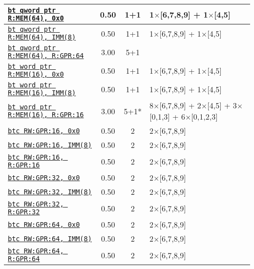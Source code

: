 \documentclass[a4paper,english,fontsize=9]{scrartcl}
\begin{document}
\begin{longtable}{p{}ccL{.25\textwidth}}
  \midrule
  \texttt{\href{https://felixcloutier.com/x86/BT.html}{bt qword ptr R:MEM(64), 0x0}} & 0.50 & 1+1 & 1\(\times\)[6,7,8,9] + 1\(\times\)[4,5] \\
  \midrule
  \texttt{\href{https://felixcloutier.com/x86/BT.html}{bt qword ptr R:MEM(64), IMM(8)}} & 0.50 & 1+1 & 1\(\times\)[6,7,8,9] + 1\(\times\)[4,5] \\
  \midrule
  \texttt{\href{https://felixcloutier.com/x86/BT.html}{bt qword ptr R:MEM(64), R:GPR:64}} & 3.00 & 5+1 &  \\
  \midrule
  \texttt{\href{https://felixcloutier.com/x86/BT.html}{bt word ptr R:MEM(16), 0x0}} & 0.50 & 1+1 & 1\(\times\)[6,7,8,9] + 1\(\times\)[4,5] \\
  \midrule
  \texttt{\href{https://felixcloutier.com/x86/BT.html}{bt word ptr R:MEM(16), IMM(8)}} & 0.50 & 1+1 & 1\(\times\)[6,7,8,9] + 1\(\times\)[4,5] \\
  \midrule
  \texttt{\href{https://felixcloutier.com/x86/BT.html}{bt word ptr R:MEM(16), R:GPR:16}} & 3.00 & 5+1* & 8\(\times\)[6,7,8,9] + 2\(\times\)[4,5] + 3\(\times\)[0,1,3] + 6\(\times\)[0,1,2,3] \\
  \midrule
  \texttt{\href{https://felixcloutier.com/x86/BTC.html}{btc RW:GPR:16, 0x0}} & 0.50 & 2 & 2\(\times\)[6,7,8,9] \\
  \midrule
  \texttt{\href{https://felixcloutier.com/x86/BTC.html}{btc RW:GPR:16, IMM(8)}} & 0.50 & 2 & 2\(\times\)[6,7,8,9] \\
  \midrule
  \texttt{\href{https://felixcloutier.com/x86/BTC.html}{btc RW:GPR:16, R:GPR:16}} & 0.50 & 2 & 2\(\times\)[6,7,8,9] \\
  \midrule
  \texttt{\href{https://felixcloutier.com/x86/BTC.html}{btc RW:GPR:32, 0x0}} & 0.50 & 2 & 2\(\times\)[6,7,8,9] \\
  \midrule
  \texttt{\href{https://felixcloutier.com/x86/BTC.html}{btc RW:GPR:32, IMM(8)}} & 0.50 & 2 & 2\(\times\)[6,7,8,9] \\
  \midrule
  \texttt{\href{https://felixcloutier.com/x86/BTC.html}{btc RW:GPR:32, R:GPR:32}} & 0.50 & 2 & 2\(\times\)[6,7,8,9] \\
  \midrule
  \texttt{\href{https://felixcloutier.com/x86/BTC.html}{btc RW:GPR:64, 0x0}} & 0.50 & 2 & 2\(\times\)[6,7,8,9] \\
  \midrule
  \texttt{\href{https://felixcloutier.com/x86/BTC.html}{btc RW:GPR:64, IMM(8)}} & 0.50 & 2 & 2\(\times\)[6,7,8,9] \\
  \midrule
  \texttt{\href{https://felixcloutier.com/x86/BTC.html}{btc RW:GPR:64, R:GPR:64}} & 0.50 & 2 & 2\(\times\)[6,7,8,9] \\

\end{longtable}
\end{document}
